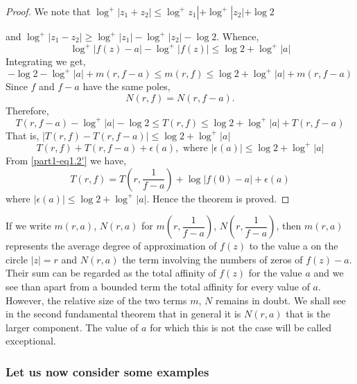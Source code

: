\begin{proof}
We note that $\log^{+}|z_{1}+z_{2}|\leq
\log^{+}z_{1}|+\log^{+}|z_{2}|+\log 2$ 

\smallskip
and \quad
$\log^{+}|z_{1}-z_{2}|\geq \log^{+}|z_{1}|-\log^{+}|z_{2}|-\log
2$. Whence,\pageoriginale
$$
\log^{+}|f(z)-a|-\log^{+}|f(z)|\leq \log 2+\log^{+}|a|
$$
Integrating we get,
$$
-\log 2-\log^{+}|a|+m(r,f-a)\leq m(r,f)\leq \log
2+\log^{+}|a|+m(r,f-a)
$$
Since $f$ and $f-a$ have the same poles,
$$
N(r,f)=N(r,f-a).
$$
Therefore,
$$
T(r,f-a)-\log^{+}|a|-\log 2\leq T(r,f)\leq \log 2+\log^{+}|a|+T(r,f-a)
$$
That is, $|T(r,f)-T(r,f-a)|\leq \log 2+\log^{+}|a|$
$$
T(r,f)+T(r,f-a)+\epsilon(a), \text{ \ where \ } |\epsilon(a)|\leq \log
2+\log^{+}|a| 
$$
From \eqref{part1-eq1.2'} we have,
$$
T(r,f)=T\left(r,\frac{1}{f-a}\right)+\log|f(0)-a|+\epsilon(a)
$$
where $|\epsilon(a)|\leq \log 2+\log^{+}|a|$.
Hence the theorem is proved.
\end{proof}

If we write $m(r,a)$, $N(r,a)$ for $m\left(r,\dfrac{1}{f-a}\right)$,
$N\left(r,\dfrac{1}{f-a}\right)$, then $m(r,a)$ represents the average
degree of approximation of $f(z)$ to the value a on the circle $|z|=r$
and $N(r,a)$ the term involving the numbers of zeros of
$f(z)-a$. Their sum can be regarded as the total affinity of $f(z)$
for the value $a$ and we see than apart from a bounded term the total
affinity for every value of $a$. However, the relative size of the two
terms $m$, $N$ remains in doubt. We shall see in the second
fundamental theorem that in general it is $N(r,a)$ that is the larger
component. The value of $a$ for which this is not the case will be
called exceptional.

\subsubsection{Let us now consider some
  examples}\label{part1-subsubsec1.3.1}\pageoriginale 

